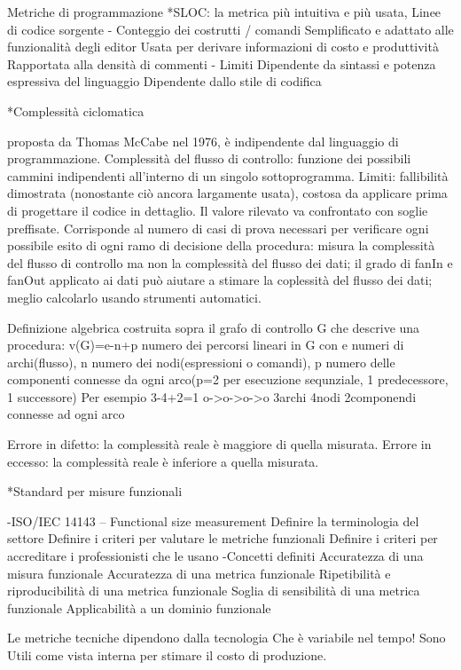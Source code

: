 \documentclass{report}
\begin{document}
Metriche di programmazione
*SLOC: la metrica più intuitiva e più usata, Linee di codice sorgente
- Conteggio dei costrutti / comandi
 Semplificato e adattato alle funzionalità degli editor
 Usata per derivare informazioni di costo e produttività
 Rapportata alla densità di commenti
- Limiti
 Dipendente da sintassi e potenza espressiva del linguaggio
 Dipendente dallo stile di codifica

*Complessità ciclomatica

proposta da Thomas McCabe nel 1976, è indipendente dal linguaggio di programmazione.
Complessità del flusso di controllo: funzione dei possibili cammini indipendenti all'interno di un singolo sottoprogramma.
Limiti: fallibilità dimostrata (nonostante ciò ancora largamente usata), costosa da applicare prima di progettare il codice in dettaglio.
Il valore rilevato va confrontato con soglie preffisate.
Corrisponde al numero di casi di prova necessari per verificare ogni possibile esito di ogni ramo di decisione della procedura: misura la complessità del flusso di controllo ma non la complessità del flusso dei dati; il grado di fanIn e fanOut applicato ai dati può aiutare a stimare la coplessità del flusso dei dati; meglio calcolarlo usando strumenti automatici.

Definizione algebrica costruita sopra il grafo di controllo G che descrive una procedura:
v(G)=e-n+p numero dei percorsi lineari in G
con e numeri di archi(flusso), n numero dei nodi(espressioni o comandi), p numero delle componenti connesse da ogni arco(p=2 per esecuzione sequnziale, 1 predecessore, 1 successore)
Per esempio
3-4+2=1 o->o->o->o 3archi 4nodi 2componendi connesse ad ogni arco

Errore in difetto: la complessità reale è maggiore di quella misurata.
Errore in eccesso: la complessità reale è inferiore a quella misurata.

*Standard per misure funzionali

-ISO/IEC 14143 – Functional size measurement
 Definire la terminologia del settore
 Definire i criteri per valutare le metriche funzionali
 Definire i criteri per accreditare i professionisti che le usano
-Concetti definiti
 Accuratezza di una misura funzionale
 Accuratezza di una metrica funzionale
 Ripetibilità e riproducibilità di una metrica funzionale
 Soglia di sensibilità di una metrica funzionale
 Applicabilità a un dominio funzionale

Le metriche tecniche dipendono dalla tecnologia Che è variabile nel tempo! Sono Utili come vista interna per stimare il costo di produzione.
\end{document}
